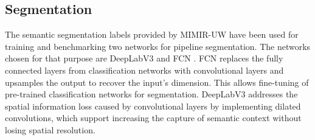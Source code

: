 







\subsection{Segmentation}

The semantic segmentation labels provided by MIMIR-UW have been used for training and benchmarking two networks for pipeline segmentation. The networks chosen for that purpose are DeepLabV3 \cite{https://doi.org/10.48550/arxiv.1706.0558} and \ac{FCN} \cite{long2015fully}. 
\Ac{FCN} replaces the fully connected layers from classification networks with convolutional layers and upsamples the output to recover the input's dimension. This allows fine-tuning of pre-trained classification networks for segmentation. DeepLabV3 addresses the spatial information loss caused by convolutional layers by implementing dilated convolutions, which support increasing the capture of semantic context without losing spatial resolution.

